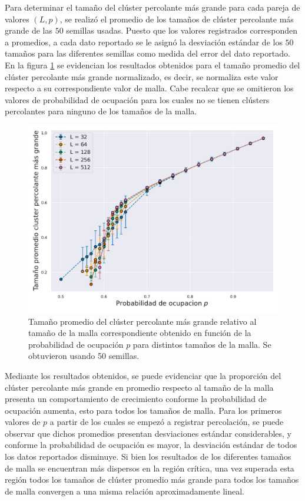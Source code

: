 \documentclass[%
 reprint,
 amsmath,amssymb,
 aps,
]{revtex4-2}
\begin{document}
Para determinar el tamaño del clúster percolante más grande para cada pareja de valores $(L, p)$, se realizó el promedio de los tamaños de clúster percolante más grande de las $50$ semillas usadas. Puesto que los valores registrados corresponden a promedios, a cada dato reportado se le asignó la desviación estándar de los $50$ tamaños para las diferentes semillas como medida del error del dato reportado. En la figura \ref{fig: tamano} se evidencian los resultados obtenidos para el tamaño promedio del clúster percolante más grande normalizado, es decir, se normaliza este valor respecto a su correspondiente valor de malla. Cabe recalcar que se omitieron los valores de probabilidad de ocupación para los cuales no se tienen clústers percolantes para ninguno de los tamaños de la malla.

\begin{figure}[H]
    \centering
    \includegraphics[width=1\linewidth]{Tamanocluster.pdf}
    \caption{Tamaño promedio del clúster percolante más grande relativo al tamaño de la malla correspondiente obtenido en función de la probabilidad de ocupación $p$ para distintos tamaños de la malla. Se obtuvieron usando 50 semillas.}
    \label{fig: tamano}
\end{figure}

Mediante los resultados obtenidos, se puede evidenciar que la proporción del clúster percolante más grande en promedio respecto al tamaño de la malla presenta un comportamiento de crecimiento conforme la probabilidad de ocupación aumenta, esto para todos los tamaños de malla. Para los primeros valores de $p$ a partir de los cuales se empezó a registrar percolación, se puede observar que dichos promedios presentan desviaciones estándar considerables, y conforme la probabilidad de ocupación es mayor, la desviación estándar de todos los datos reportados disminuye. Si bien los resultados de los diferentes tamaños de malla se encuentran más dispersos en la región crítica, una vez superada esta región todos los tamaños de clúster promedio más grande para todos los tamaños de malla convergen a una misma relación aproximadamente lineal. 
\end{document}
